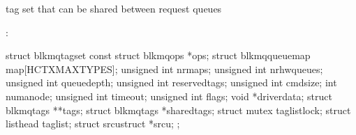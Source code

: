 \documentclass[a4paper,11pt,english]{sphinxmanual}
\begin{document}
\begin{fulllineitems}
\label{\detokenize{blk-mq:c.blk_mq_tag_set}}
tag set that can be shared between request queues

\end{fulllineitems}


:

\begin{sphinxVerbatim}[commandchars=\\\{\}]
struct blk\PYGZus{}mq\PYGZus{}tag\PYGZus{}set \PYGZob{}
    const struct blk\PYGZus{}mq\PYGZus{}ops *ops;
    struct blk\PYGZus{}mq\PYGZus{}queue\PYGZus{}map map[HCTX\PYGZus{}MAX\PYGZus{}TYPES];
    unsigned int            nr\PYGZus{}maps;
    unsigned int            nr\PYGZus{}hw\PYGZus{}queues;
    unsigned int            queue\PYGZus{}depth;
    unsigned int            reserved\PYGZus{}tags;
    unsigned int            cmd\PYGZus{}size;
    int numa\PYGZus{}node;
    unsigned int            timeout;
    unsigned int            flags;
    void *driver\PYGZus{}data;
    struct blk\PYGZus{}mq\PYGZus{}tags      **tags;
    struct blk\PYGZus{}mq\PYGZus{}tags      *shared\PYGZus{}tags;
    struct mutex            tag\PYGZus{}list\PYGZus{}lock;
    struct list\PYGZus{}head        tag\PYGZus{}list;
    struct srcu\PYGZus{}struct      *srcu;
\PYGZcb{};
\end{sphinxVerbatim}
\end{document}
